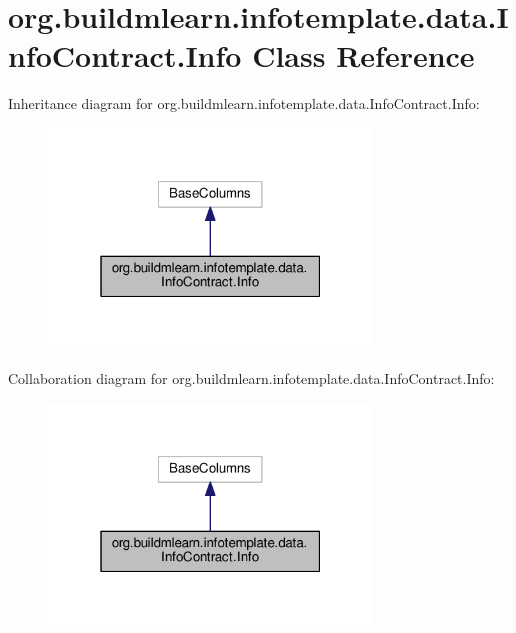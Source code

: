\hypertarget{classorg_1_1buildmlearn_1_1infotemplate_1_1data_1_1InfoContract_1_1Info}{}\section{org.\+buildmlearn.\+infotemplate.\+data.\+Info\+Contract.\+Info Class Reference}
\label{classorg_1_1buildmlearn_1_1infotemplate_1_1data_1_1InfoContract_1_1Info}


Inheritance diagram for org.\+buildmlearn.\+infotemplate.\+data.\+Info\+Contract.\+Info\+:
\nopagebreak
\begin{figure}[H]
\begin{center}
\leavevmode
\includegraphics[width=244pt]{classorg_1_1buildmlearn_1_1infotemplate_1_1data_1_1InfoContract_1_1Info__inherit__graph}
\end{center}
\end{figure}


Collaboration diagram for org.\+buildmlearn.\+infotemplate.\+data.\+Info\+Contract.\+Info\+:
\nopagebreak
\begin{figure}[H]
\begin{center}
\leavevmode
\includegraphics[width=244pt]{classorg_1_1buildmlearn_1_1infotemplate_1_1data_1_1InfoContract_1_1Info__coll__graph}
\end{center}
\end{figure}
